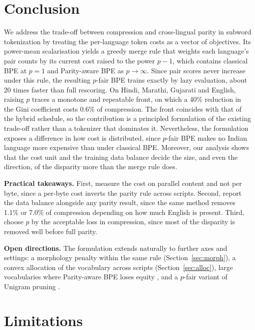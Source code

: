 \section{Conclusion}
\label{sec:conclusion}

We address the trade-off between compression and cross-lingual parity in subword
tokenization by treating the per-language token costs as a vector of objectives. Its
power-mean scalarisation yields a greedy merge rule that weights each language's pair counts
by its current cost raised to the power $p-1$, which contains classical BPE at $p=1$ and
Parity-aware BPE as $p\to\infty$. Since pair scores never increase under this rule, the
resulting $p$-fair BPE trains exactly by lazy evaluation, about 20 times faster than full
rescoring. On Hindi, Marathi, Gujarati and English, raising $p$ traces a monotone and
repeatable front, on which a 40\% reduction in the Gini coefficient costs 0.6\% of
compression. The front coincides with that of the hybrid schedule, so the contribution is a
principled formulation of the existing trade-off rather than a tokenizer that dominates it.
Nevertheless, the formulation exposes a difference in how cost is distributed, since
$p$-fair BPE makes no Indian language more expensive than under classical BPE. Moreover, our
analysis shows that the cost unit and the training data balance decide the size, and even
the direction, of the disparity more than the merge rule does.

\noindent\textbf{Practical takeaways.} First, measure the cost on parallel content and not
per byte, since a per-byte cost inverts the parity rule across scripts. Second, report the
data balance alongside any parity result, since the same method removes 1.1\% or 7.0\% of
compression depending on how much English is present. Third, choose $p$ by the acceptable
loss in compression, since most of the disparity is removed well before full parity.

\noindent\textbf{Open directions.} The formulation extends naturally to further axes and
settings: a morphology penalty within the same rule (Section~\ref{sec:morph}), a convex
allocation of the vocabulary across scripts (Section~\ref{sec:alloc}), large vocabularies
where Parity-aware BPE loses equity \citep{lee2026}, and a $p$-fair variant of Unigram
pruning \citep{kudo2018}.

\section*{Limitations}

